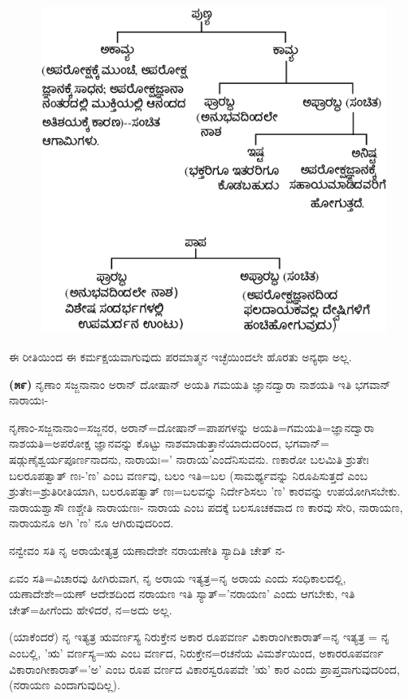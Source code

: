 \vspace{-.25cm}

\begin{figure}[!htbp]
\includegraphics[scale=.082]{images/fig4.jpg}
\end{figure}

ಈ ರೀತಿಯಿಂದ ಈ ಕರ್ಮಕ್ಷಯವಾಗುವುದು ಪರಮಾತ್ಮನ ಇಚ್ಛೆಯಿಂದಲೇ ಹೊರತು ಅನ್ಯಥಾ ಅಲ್ಲ.

\textbf{(೫೯)} ನೃಣಾಂ ಸಜ್ಜನಾನಾಂ ಅರಾನ್ ದೋಷಾನ್ ಅಯತಿ ಗಮಯತಿ ಜ್ಞಾನದ್ವಾರಾ ನಾಶಯತಿ ಇತಿ ಭಗವಾನ್ ನಾರಾಯಃ-

ನೃಣಾಂ-ಸಜ್ಜನಾನಾಂ=ಸಜ್ಜನರ, ಅರಾನ್=ದೋಷಾನ್=ಪಾಪಗಳನ್ನು ಅಯತಿ=ಗಮ\-ಯತಿ=ಜ್ಞಾನದ್ವಾರಾ ನಾಶಯತಿ=ಅಪರೋಕ್ಷ ಜ್ಞಾನವನ್ನು ಕೊಟ್ಟು ನಾಶಮಾಡುತ್ತಾನೆಯಾದುದರಿಂದ, ಭಗವಾನ್= ಷಡ್ಗುಣೈಶ್ವರ್ಯಪೂರ್ಣನಾದನು, ನಾರಾಯಃ=' ನಾರಾಯ'\break ಎಂದೆನಿಸುವನು. ಣಕಾರೋ ಬಲಮಿತಿ ಶ್ರುತೇಃ ಬಲರೂಪತ್ವಾತ್ ಣಃ-'ಣ' ಎಂಬ ವರ್ಣವು, ಬಲಂ ಇತಿ=ಬಲ (ಸಾಮರ್ಥ್ಯವನ್ನು ನಿರೂಪಿಸುತ್ತದೆ ಎಂಬ ಶ್ರುತೇಃ=ಶ್ರುತಿರೀತಿಯಾಗಿ, ಬಲರೂಪತ್ವಾತ್ ಣಃ=ಬಲವನ್ನು ನಿರ್ದೇಶಿಸಲು 'ಣ' ಕಾರವನ್ನು ಉಪಯೋಗಿಸಬೇಕು. ನಾರಾಯಶ್ವಾಸೌ ಣಶ್ಚೇತಿ ನಾರಾಯಣಃ- ನಾರಾಯ ಎಂಬ ಪದಕ್ಕೆ ಬಲಸೂಚಕವಾದ ಣ ಕಾರವು ಸೇರಿ, ನಾರಾಯಣ, ನಾರಾಯನೂ ಅಗಿ 'ಣ' ನೂ ಆಗಿರುವುದರಿಂದ.

ನನ್ವೇವಂ ಸತಿ ನೃ ಅರಾಯೇತ್ಯತ್ರ ಯಣಾದೇಶೇ ನರಾಯಣೇತಿ ಸ್ಯಾದಿತಿ ಚೇತ್ ನ-

ಏವಂ ಸತಿ=ವಿಚಾರವು ಹೀಗಿರುವಾಗ, ನೃ ಅರಾಯ ಇತ್ಯತ್ರ=ನೃ ಅರಾಯ ಎಂದು ಸಂಧಿಕಾಲದಲ್ಲಿ, ಯಣಾದೇಶೇ=ಯಣ್ ಆದೇಶದಿಂದ ನರಾಯಣ ಇತಿ ಸ್ಯಾತ್='ನರಾಯಣ' ಎಂದು ಆಗಬೇಕು, ಇತಿ ಚೇತ್=ಹೀಗೆಂದು ಹೇಳಿದರೆ, ನ=ಅದು ಅಲ್ಲ.

(ಯಾಕೆಂದರೆ) ನೃ ಇತ್ಯತ್ರ ಋವರ್ಣಸ್ಯ ನಿರುಕ್ತೇನ ಅಕಾರ ರೂಪವರ್ಣ ವಿಕಾರಾಂಗೀಕಾರಾತ್=ನೃ ಇತ್ಯತ್ರ = ನೃ ಎಂಬಲ್ಲಿ, 'ಋ' ವರ್ಣಸ್ಯ=ಋ ಎಂಬ ವರ್ಣದ, ನಿರುಕ್ತೇನ=ರಚನೆಯ ವಿಮರ್ಶೆಯಿಂದ, ಅಕಾರರೂಪವರ್ಣ ವಿಕಾರಾಂಗೀಕಾರಾತ್='ಅ' ಎಂಬ ರೂಪ ವರ್ಣದ ವಿಕಾರಸ್ವರೂಪವೇ 'ಋ' ಕಾರ ಎಂದು ಪ್ರಾಪ್ತವಾಗುವುದರಿಂದ, (ನರಾಯಣ ಎಂದಾಗುವುದಿಲ್ಲ).

